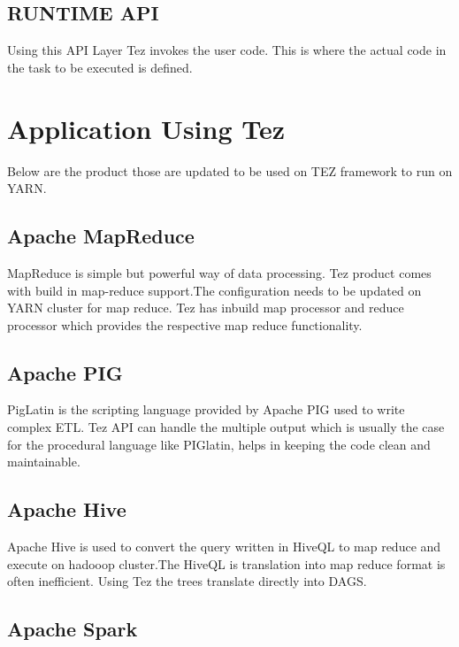 \documentclass[9pt,twocolumn,twoside]{styles/osajnl}
\begin{document}
\subsection{RUNTIME API}
 	
	Using this API Layer Tez invokes the user code. This is where the actual code in the task  
to be executed is defined.


\section{Application Using Tez}

     Below are the product those are updated to be used on TEZ framework to run on YARN.
 
               
\subsection{Apache MapReduce}
      
    MapReduce is simple but powerful way of data processing. Tez product comes with
    build in map-reduce support.The configuration needs to be updated on YARN cluster
    for map reduce. Tez has inbuild map processor and reduce processor which provides the
    respective map reduce functionality.
               
 \subsection{Apache PIG}              
              
   PigLatin is the scripting language provided by Apache PIG used to write complex ETL.
   Tez API can handle the multiple output which is usually the case for the procedural language    like PIGlatin, helps in keeping the code clean and maintainable.
 
  \subsection{Apache Hive}
              
   Apache Hive is used to convert the query written in HiveQL to map reduce and execute on hadooop cluster.The HiveQL is translation into map reduce format is often inefficient. Using Tez the trees translate directly into DAGS.
               
 \subsection{Apache Spark}
         
\end{document}

